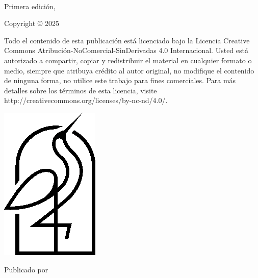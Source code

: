 
{\small
\setlength{\parindent}{0em}\setlength{\parskip}{1em}
~
\vfill

Primera edición, \editionyear{}

Copyright \copyright{} 2025 \authorname


Todo el contenido de esta publicación está licenciado bajo la Licencia Creative Commons Atribución-NoComercial-SinDerivadas 4.0 Internacional. Usted está autorizado a compartir, copiar y redistribuir el material en cualquier formato o medio, siempre que atribuya crédito al autor original, no modifique el contenido de ninguna forma, no utilice este trabajo para fines comerciales. Para más detalles sobre los términos de esta licencia, visite http://creativecommons.org/licenses/by-nc-nd/4.0/.  

\ifx\isbn\undefined\else\if\relax\detokenize\expandafter{\isbn}\relax{}\fi\fi

\includegraphics[width=0.07\linewidth]{frontmatter/logo-black.png}

Publicado por \publisher{}
}
